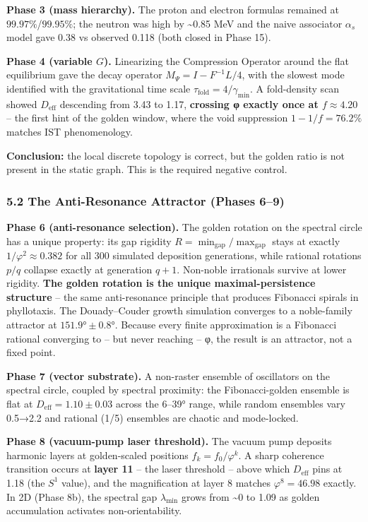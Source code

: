 \documentclass[
]{article}
\begin{document}
\textbf{Phase 3 (mass hierarchy).} The proton and electron formulas
remained at \(99.97\%\)/\(99.95\%\); the neutron was high by
\textasciitilde0.85 MeV and the naive associator \(\alpha_s\) model gave
0.38 vs observed 0.118 (both closed in Phase 15).

\textbf{Phase 4 (variable \(G\)).} Linearizing the Compression Operator
around the flat equilibrium gave the decay operator
\(M_\Psi = I - F^{-1}L/4\), with the slowest mode identified with the
gravitational time scale \(\tau_{\text{fold}} = 4/\gamma_{\min}\). A
fold-density scan showed \(D_{\text{eff}}\) descending from 3.43 to
1.17, \textbf{crossing φ exactly once at \(f \approx 4.20\)} -- the
first hint of the golden window, where the void suppression
\(1 - 1/f = 76.2\%\) matches IST phenomenology.

\textbf{Conclusion:} the local discrete topology is correct, but the
golden ratio is not present in the static graph. This is the required
negative control.

\subsubsection{5.2 The Anti-Resonance Attractor (Phases
6--9)}\label{the-anti-resonance-attractor-phases-69}

\textbf{Phase 6 (anti-resonance selection).} The golden rotation on the
spectral circle has a unique property: its gap rigidity
\(R = \min_{\text{gap}}/\max_{\text{gap}}\) stays at exactly
\(1/\varphi^2 \approx 0.382\) for all 300 simulated deposition
generations, while rational rotations \(p/q\) collapse exactly at
generation \(q + 1\). Non-noble irrationals survive at lower rigidity.
\textbf{The golden rotation is the unique maximal-persistence structure}
-- the same anti-resonance principle that produces Fibonacci spirals in
phyllotaxis. The Douady--Couder growth simulation converges to a
noble-family attractor at \(151.9° \pm 0.8°\). Because every finite
approximation is a Fibonacci rational converging to -- but never
reaching -- φ, the result is an attractor, not a fixed point.

\textbf{Phase 7 (vector substrate).} A non-raster ensemble of
oscillators on the spectral circle, coupled by spectral proximity: the
Fibonacci-golden ensemble is flat at \(D_{\text{eff}} = 1.10 \pm 0.03\)
across the 6--39° range, while random ensembles vary 0.5→2.2 and
rational (1/5) ensembles are chaotic and mode-locked.

\textbf{Phase 8 (vacuum-pump laser threshold).} The vacuum pump deposits
harmonic layers at golden-scaled positions \(f_k = f_0/\varphi^k\). A
sharp coherence transition occurs at \textbf{layer 11} -- the laser
threshold -- above which \(D_{\text{eff}}\) pins at 1.18 (the \(S^1\)
value), and the magnification at layer 8 matches \(\varphi^8 = 46.98\)
exactly. In 2D (Phase 8b), the spectral gap \(\lambda_{\min}\) grows
from \textasciitilde0 to 1.09 as golden accumulation activates
non-orientability.
\end{document}
